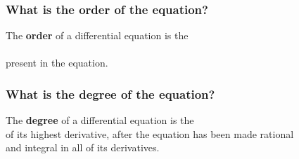 \documentclass[fleqn]{beamer} %
\newcommand{\sectionIsubsectionIIItitle}{}
\begin{document}
			\begin{frame} 
				\frametitle{\sectionIsubsectionIIItitle}
				\bigskip

				\frametitle{What is the order of the equation?}
  
The {\bf order} of a differential equation is the \vspace{3mm}\\ \underline{\hspace{50mm}}\hspace{3mm}\underline{\hspace{50mm}} \vspace{5mm}\\ present in the equation. \vspace{3mm}\\	

			 
				\btVFill
			\end{frame}	

			\begin{frame} 
				\frametitle{\sectionIsubsectionIIItitle}
				\bigskip

				  \frametitle{What is the degree of the equation?}

The {\bf degree} of a differential equation is the \underline{\hspace{30mm}}\hspace{3mm} \vspace{5mm}\\ of its highest derivative, after the equation has been made rational \vspace{5mm}\\ and integral in all of its derivatives. \vspace{3mm}\\

			 
				\btVFill
			\end{frame}	
\end{document}
